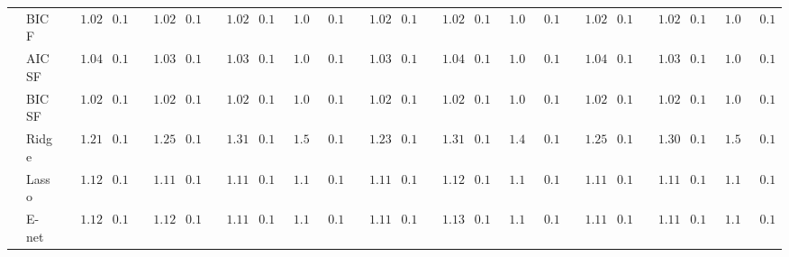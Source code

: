 \begin{tabular}{p{0.2cm}p{1cm}|p{0.6cm}p{0.6cm}|p{0.6cm}p{0.6cm}p{0.6cm}p{0.6cm}p{0.6cm}p{0.6cm}|p{0.6cm}p{0.6cm}p{0.6cm}p{0.6cm}p{0.6cm}p{0.6cm}|p{0.6cm}p{0.6cm}p{0.6cm}p{0.6cm}p{0.6cm}p{0.6cm}}
 & BIC F  & $\phantom{00}1.02$ & $\phantom{0}0.10$ & $\phantom{00}1.02$ & $\phantom{0}0.10$ & $\phantom{00}1.02$ & $\phantom{0}0.11$ & $\phantom{0}1.03$ & $\phantom{0}0.11$ & $\phantom{00}1.02$ & $\phantom{0}0.11$ & $\phantom{00}1.02$ & $\phantom{0}0.10$ & $\phantom{0}1.03$ & $\phantom{0}0.11$ & $\phantom{00}1.02$ & $\phantom{0}0.10$ & $\phantom{00}1.02$ & $\phantom{0}0.10$ & $\phantom{0}1.03$ & $\phantom{0}0.11$ \\
 & AIC SF  & $\phantom{00}1.04$ & $\phantom{0}0.11$ & $\phantom{00}1.03$ & $\phantom{0}0.11$ & $\phantom{00}1.03$ & $\phantom{0}0.11$ & $\phantom{0}1.04$ & $\phantom{0}0.11$ & $\phantom{00}1.03$ & $\phantom{0}0.10$ & $\phantom{00}1.04$ & $\phantom{0}0.10$ & $\phantom{0}1.03$ & $\phantom{0}0.11$ & $\phantom{00}1.04$ & $\phantom{0}0.11$ & $\phantom{00}1.03$ & $\phantom{0}0.11$ & $\phantom{0}1.03$ & $\phantom{0}0.11$ \\
 & BIC SF  & $\phantom{00}1.02$ & $\phantom{0}0.10$ & $\phantom{00}1.02$ & $\phantom{0}0.10$ & $\phantom{00}1.02$ & $\phantom{0}0.11$ & $\phantom{0}1.03$ & $\phantom{0}0.11$ & $\phantom{00}1.02$ & $\phantom{0}0.11$ & $\phantom{00}1.02$ & $\phantom{0}0.10$ & $\phantom{0}1.03$ & $\phantom{0}0.11$ & $\phantom{00}1.02$ & $\phantom{0}0.10$ & $\phantom{00}1.02$ & $\phantom{0}0.10$ & $\phantom{0}1.03$ & $\phantom{0}0.11$ \\
 & Ridge  & $\phantom{00}1.21$ & $\phantom{0}0.14$ & $\phantom{00}1.25$ & $\phantom{0}0.15$ & $\phantom{00}1.31$ & $\phantom{0}0.17$ & $\phantom{0}1.54$ & $\phantom{0}0.17$ & $\phantom{00}1.23$ & $\phantom{0}0.14$ & $\phantom{00}1.31$ & $\phantom{0}0.16$ & $\phantom{0}1.48$ & $\phantom{0}0.17$ & $\phantom{00}1.25$ & $\phantom{0}0.14$ & $\phantom{00}1.30$ & $\phantom{0}0.16$ & $\phantom{0}1.52$ & $\phantom{0}0.16$ \\
 & Lasso  & $\phantom{00}1.12$ & $\phantom{0}0.13$ & $\phantom{00}1.11$ & $\phantom{0}0.13$ & $\phantom{00}1.11$ & $\phantom{0}0.14$ & $\phantom{0}1.12$ & $\phantom{0}0.13$ & $\phantom{00}1.11$ & $\phantom{0}0.12$ & $\phantom{00}1.12$ & $\phantom{0}0.13$ & $\phantom{0}1.12$ & $\phantom{0}0.13$ & $\phantom{00}1.11$ & $\phantom{0}0.12$ & $\phantom{00}1.11$ & $\phantom{0}0.14$ & $\phantom{0}1.12$ & $\phantom{0}0.13$ \\
 & E-net  & $\phantom{00}1.12$ & $\phantom{0}0.13$ & $\phantom{00}1.12$ & $\phantom{0}0.13$ & $\phantom{00}1.11$ & $\phantom{0}0.14$ & $\phantom{0}1.12$ & $\phantom{0}0.13$ & $\phantom{00}1.11$ & $\phantom{0}0.12$ & $\phantom{00}1.13$ & $\phantom{0}0.13$ & $\phantom{0}1.12$ & $\phantom{0}0.13$ & $\phantom{00}1.11$ & $\phantom{0}0.13$ & $\phantom{00}1.11$ & $\phantom{0}0.14$ & $\phantom{0}1.13$ & $\phantom{0}0.13$ \\

\end{tabular}
